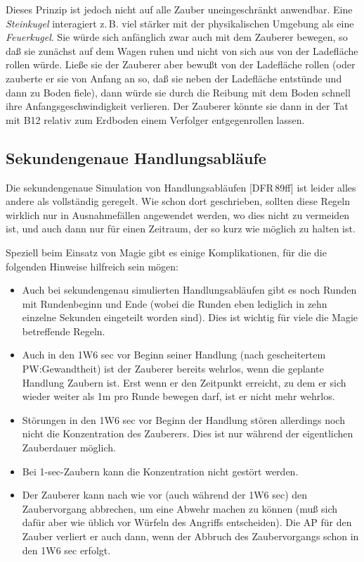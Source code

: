 \documentclass[10pt,a4paper,germanpar]{article}
\begin{document}
Dieses Prinzip ist jedoch nicht auf alle Zauber uneingeschränkt
anwendbar. Eine \emph{Steinkugel} interagiert z.\,B. viel stärker mit
der physikalischen Umgebung als eine \emph{Feuerkugel}. Sie würde
sich anfänglich zwar auch mit dem Zauberer bewegen, so daß sie
zunächst auf dem Wagen ruhen und nicht von sich aus von der
Ladefläche rollen würde. Ließe sie der Zauberer aber bewußt von der
Ladefläche rollen (oder zauberte er sie von Anfang an so, daß sie
neben der Ladefläche entstünde und dann zu Boden fiele), dann würde
sie durch die Reibung mit dem Boden schnell ihre
Anfangsgeschwindigkeit verlieren. Der Zauberer könnte sie dann in der
Tat mit B12 relativ zum Erdboden einem Verfolger entgegenrollen
lassen.


\subsection{Sekundengenaue Handlungsabläufe}

Die sekundengenaue Simulation von Handlungsabläufen [DFR\,89ff] ist
leider alles andere als vollständig geregelt. Wie schon dort
geschrieben, sollten diese Regeln wirklich nur in Ausnahmefällen
angewendet werden, wo dies nicht zu vermeiden ist, und auch dann nur
für einen Zeitraum, der so kurz wie möglich zu halten ist.

Speziell beim Einsatz von Magie gibt es einige Komplikationen, für die
die folgenden Hinweise hilfreich sein mögen:

\begin{itemize}
\item Auch bei sekundengenau simulierten Handlungsabläufen gibt es
  noch Runden mit Rundenbeginn und Ende (wobei die Runden eben
  lediglich in zehn einzelne Sekunden eingeteilt worden sind). Dies
  ist wichtig für viele die Magie betreffende Regeln.
\item Auch in den 1W6 sec vor Beginn seiner Handlung (nach gescheitertem
  PW:Gewandtheit) ist der Zauberer bereits wehrlos, wenn die geplante Handlung
  Zaubern ist. Erst wenn er den Zeitpunkt erreicht, zu dem er sich
  wieder weiter als 1m pro Runde bewegen darf, ist er nicht mehr wehrlos.
\item Störungen in den 1W6 sec vor Beginn der Handlung stören
  allerdings noch nicht die Konzentration des Zauberers. Dies ist nur
  während der eigentlichen Zauberdauer möglich.
\item Bei 1-sec-Zaubern kann die Konzentration nicht gestört werden.
\item Der Zauberer kann nach wie vor (auch während der 1W6 sec) den
  Zaubervorgang abbrechen, um eine Abwehr machen zu können (muß sich dafür
  aber wie üblich vor Würfeln des Angriffs entscheiden). Die AP für den Zauber
  verliert er auch dann, wenn der Abbruch des Zaubervorgangs schon in den 1W6
  sec erfolgt. 
\end{itemize}
\end{document}
